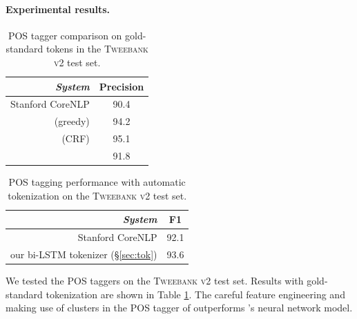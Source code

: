 \documentclass[11pt,a4paper]{article}
\begin{document}
\paragraph{Experimental results.}

\begin{table}[t]
	\centering
	\begin{tabular}{rc}
		\hline
		\it System & Precision \\
		\hline
		Stanford CoreNLP & 90.4 \\
		\citealp{owoputi-EtAl:2013:NAACL-HLT} (greedy) & 94.2 \\
		\citealp{owoputi-EtAl:2013:NAACL-HLT} (CRF) & 95.1 \\
		\hdashline
		\citealp{ma-hovy:2016:P16-1} & 91.8 \\
		\hline
	\end{tabular}
	\caption{POS tagger comparison on gold-standard tokens in the
          \textsc{Tweebank v2} test set. \label{tbl:pos-result}}
\end{table}

\begin{table}[t]
	\centering
	\begin{tabular}{rc}
		\hline
		\it System & F1 \\
		\hline
		Stanford CoreNLP & 92.1 \\
		our bi-LSTM tokenizer (\S\ref{sec:tok}) & 93.6 \\
		\hline
	\end{tabular}
	\caption{\citet{owoputi-EtAl:2013:NAACL-HLT} POS tagging performance with automatic tokenization on
          the \textsc{Tweebank v2} test set. \label{tbl:pos-result-vs-tok}}
\end{table}

We tested the POS taggers on the \textsc{Tweebank v2} test set.  Results
with gold-standard tokenization are shown in
Table \ref{tbl:pos-result}. The careful feature engineering and making use of
\citet{Brown:1992:CNG:176313.176316} clusters in the 
POS tagger of \citet{owoputi-EtAl:2013:NAACL-HLT} outperforms \citet{ma-hovy:2016:P16-1}'s neural network
model. 
\end{document}
